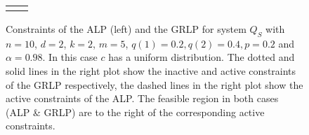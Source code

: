 \begin{figure}[H]
\begin{tabular}{cc}

&

\end{tabular}
\caption{Constraints of the ALP (left) and the GRLP for system $Q_S$  with $n=10$, $d=2$, $k=2$, $m=5$, $q(1)=0.2, q(2)=0.4, p=0.2$ and $\alpha=0.98$. In this case $c$ has a uniform distribution.
The dotted and solid lines in the right plot show the inactive and active constraints of the GRLP respectively, the dashed lines in the right plot show the active constraints of the ALP. The feasible region in both cases (ALP \& GRLP) are to the right of the corresponding active constraints.}
\label{feasible}
\end{figure}
